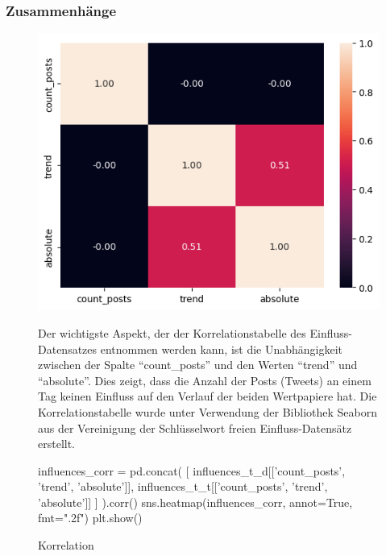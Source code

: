 \documentclass{article}
\begin{document}
\subsubsection{Zusammenhänge}
\begin{figure}[!htb]
	\begin{minipage}{0.4\textwidth}
    		\includegraphics[width=\textwidth]{../imgs/Korrelation.png}
    		\caption{Korrelation}
    		\label{fig:Korrelation}
  	\end{minipage}
  	\hfill
	\begin{minipage}{0.55\textwidth}
		Der wichtigste Aspekt, der der Korrelationstabelle des Einfluss-Datensatzes entnommen werden kann, ist die Unabhängigkeit zwischen der Spalte ``count\_posts'' und den Werten ``trend'' und ``absolute''.
		Dies zeigt, dass die Anzahl der Posts (Tweets) an einem Tag keinen Einfluss auf den Verlauf der beiden Wertpapiere hat.
		Die Korrelationstabelle wurde unter Verwendung der Bibliothek Seaborn aus der Vereinigung der Schlüsselwort freien Einfluss-Datensätz erstellt.
	\begin{python}
	influences_corr = pd.concat(
	    [
	        influences_t_d[['count_posts', 'trend', 'absolute']],
	        influences_t_t[['count_posts', 'trend', 'absolute']]
	    ]
	).corr()
	sns.heatmap(influences_corr, annot=True, fmt=".2f")
	plt.show()
	\end{python}
		
	\end{minipage}
\end{figure}
\end{document}
